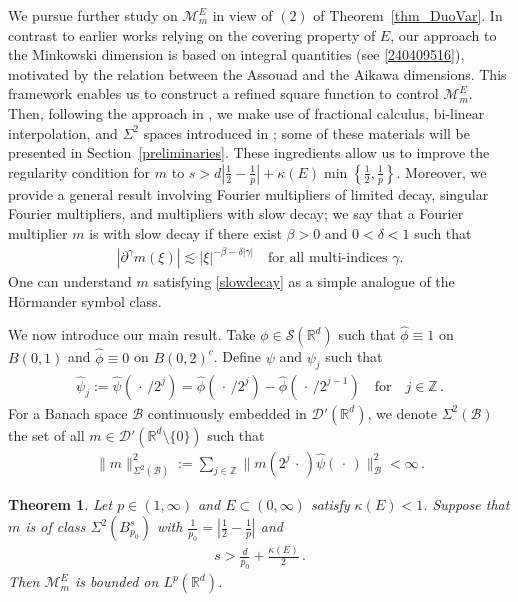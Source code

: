 \documentclass[11pt]{amsart}
\theoremstyle{plain}
\newtheorem{theorem}{Theorem}[section]
\theoremstyle{definition}
\theoremstyle{remark}
\numberwithin{equation}{section}
\newcommand{\R}{\mathbb{R}}
\newcommand{\Z}{\mathbb{Z}}
\newcommand{\cB}{\mathcal{B}}
\newcommand{\cD}{\mathcal{D}}
\newcommand{\bR}{\mathbb{R}}
\newcommand{\q}{\quad}
\newcommand{\wh}{\widehat}
\begin{document}
We pursue further study on $\mathcal{M}_m^E$ in view of $(2)$ of Theorem~\ref{thm_DuoVar}.
In contrast to earlier works relying on the covering property of $E$, our approach to the Minkowski dimension is based on integral quantities (see \eqref{240409516}), motivated by the relation between the Assouad and the Aikawa dimensions. 
This framework enables us to construct a refined square function to control  $\mathcal{M}_m^E$.
Then, following the approach in \cite{LeeSeo_2023}, we make use of fractional calculus, bi-linear interpolation, and $\Sigma^2$ spaces introduced in \cite{LeeSeo_2023}; some of these materials will be presented in Section~\ref{preliminaries}.
These ingredients allow us to improve the regularity condition for $m$ to $s>d\left|\frac{1}{2}-\frac{1}{p}\right|+\kappa(E)\min\left\{\frac{1}{2}, \frac{1}{p}\right\}$.
Moreover, we provide a general result involving Fourier multipliers of limited decay, singular Fourier multipliers, and multipliers with slow decay;
we say that a Fourier multiplier $m$ is with slow decay if there exist $\beta>0$ and $0<\delta<1$ such that
\begin{align}\label{slowdecay}
    \left|\partial^\gamma m(\xi)\right| \lesssim |\xi|^{-\beta-\delta|\gamma|}\quad \text{for all multi-indices $\gamma$.}
\end{align}
One can understand $m$ satisfying \eqref{slowdecay} as a simple analogue of the H\"ormander symbol class.

We now introduce our main result.
Take $\phi \in \mathscr{S}(\R^d)$ such that $\wh{\phi} \equiv 1$ on $B(0,1)$ and $\wh{\phi} \equiv 0$ on $B(0,2)^c$.
Define $\psi$ and $\psi_j$ such that
\begin{align}\label{psi}
\wh{\psi}_j := \wh{\psi}(\,\cdot\,/2^j) =\wh{\phi}(\,\cdot\,/2^j) - \wh{\phi}(\,\cdot\,/2^{j-1})\q \text{for}\q j\in\Z\,.
\end{align}
For a Banach space $\cB$ continuously embedded in $\cD'(\bR^d)$,
we denote $\Sigma^2(\cB)$ the set of all $m\in\cD'(\bR^d\setminus\{0\})$ such that
\begin{align}\label{vv Banach}
\|m\|_{\Sigma^2(\cB)}^2:=\sum_{j\in\Z} \| m(2^j \,\cdot\,) \wh{\psi}(\,\cdot\,) \|_{\cB}^2 <\infty\,.
\end{align}
\begin{theorem}\label{thm_main}
    Let $p\in(1,\infty)$ and $E\subset(0,\infty)$ satisfy $\kappa(E)<1$.
    Suppose that $m$ is of class $\Sigma^2(B_{p_0}^s)$ with $\frac{1}{p_0}=\left|\frac{1}{2}-\frac{1}{p}\right|$ and 
    \begin{align}\label{240328_1552}
        s>\frac{d}{p_0} + \frac{\kappa(E)}{2}\,.
    \end{align}
    Then $\mathcal{M}_m^E$ is bounded on $L^p(\bR^d)$.
\end{theorem}
\end{document}
